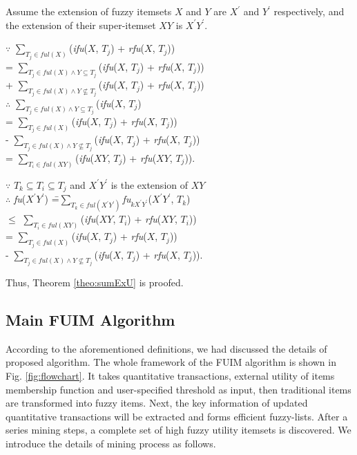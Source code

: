 \documentclass[journal]{IEEEtran}
\newenvironment{proof}{{\noindent\it\bf Proof}\quad}{\par}
\begin{document}
\begin{proof}
	Assume the extension of fuzzy itemsets $X$ and $Y$ are $X^\prime$ and $Y^\prime$ respectively, and the extension of their super-itemset $XY$ is $X^\prime$$Y^\prime$.
	\begin{tabbing}
		$\because$ $\sum_{T_j \in ful(X)}$(\textit{ifu}($X$, $T_j$) + \textit{rfu}($X$, $T_j$)) \= \\
		= $\sum_{T_j \in ful(X) \land Y \subseteq T_j}$(\textit{ifu}($X$, $T_j$) + \textit{rfu}($X$, $T_j$)) \\
		+ $\sum_{T_j \in ful(X) \land Y \not\subseteq T_j}$(\textit{ifu}($X$, $T_j$) + \textit{rfu}($X$, $T_j$)) \\
		$\therefore$ $\sum_{T_j \in ful(X) \land Y \subseteq T_j}$(\textit{ifu}($X$, $T_j$) \= \\
		= $\sum_{T_j \in ful(X)}$(\textit{ifu}($X$, $T_j$) + \textit{rfu}($X$, $T_j$)) \\ - $\sum_{T_j \in ful(X) \land Y \not\subseteq T_j}$(\textit{ifu}($X$, $T_j$) + \textit{rfu}($X$, $T_j$)) \\
		= $\sum_{T_i \in ful(XY)}$(\textit{ifu}($XY$, $T_j$) + \textit{rfu}($XY$, $T_j$)).
	\end{tabbing}
	\begin{tabbing}
		$\because$ $T_k \subseteq T_i \subseteq T_j$ and $X^\prime$$Y^\prime$ is the extension of $XY$ \\
		$\therefore$ \textit{fu}($X^\prime$$Y^\prime$) \= =$\sum_{T_k \in ful(X^\prime Y^\prime)}$\textit{fu}$_{kX^\prime Y^\prime}$($X^\prime$$Y^\prime$, $T_k$) \\
		\> $\le$ $\sum_{T_i \in ful(XY)}$(\textit{ifu}($XY$, $T_i$) + \textit{rfu}($XY$, $T_i$)) \\
		\> = $\sum_{T_j \in ful(X)}$(\textit{ifu}($X$, $T_j$) + \textit{rfu}($X$, $T_j$)) \\
		\> - $\sum_{T_j \in ful(X) \land Y \not\subseteq T_j}$(\textit{ifu}($X$, $T_j$) + \textit{rfu}($X$, $T_j$)).
	\end{tabbing}
	Thus, Theorem \ref{theo:sumExU} is proofed.
\end{proof}

\subsection{Main FUIM Algorithm}

According to the aforementioned definitions, we had discussed the details of proposed algorithm. The whole framework of the FUIM algorithm is shown in Fig. \ref{fig:flowchart}. It takes quantitative transactions, external utility of items membership function and user-specified threshold as input, then traditional items are transformed into fuzzy items. Next, the key information of updated quantitative transactions will be extracted and forms efficient fuzzy-lists. After a series mining steps, a complete set of high fuzzy utility itemsets is discovered. We introduce the details of mining process as follows.
\end{document}
